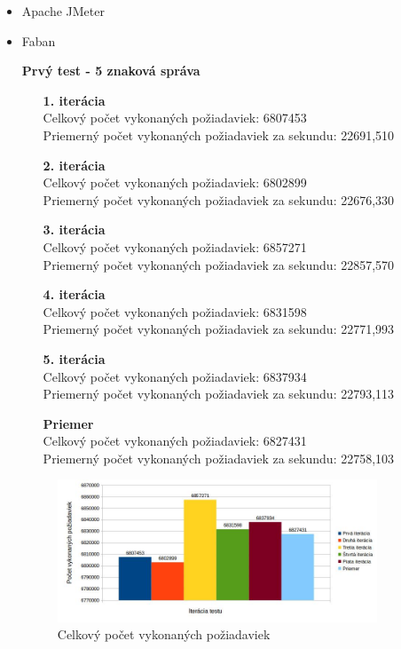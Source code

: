 \documentclass[12pt,oneside,final]{fithesis-utf8}
\begin{document}
\begin{itemize}

\item Apache JMeter

\item Faban

\textbf{Prvý test - 5 znaková správa}
\begin{itemize}

\item[\textbf{1. iterácia}]\ \\
Celkový počet vykonaných požiadaviek: 6807453\\
Priemerný počet vykonaných požiadaviek za sekundu: 22691,510

\item[\textbf{2. iterácia}]\ \\
Celkový počet vykonaných požiadaviek: 6802899\\
Priemerný počet vykonaných požiadaviek za sekundu: 22676,330

\item[\textbf{3. iterácia}]\ \\
Celkový počet vykonaných požiadaviek: 6857271\\
Priemerný počet vykonaných požiadaviek za sekundu: 22857,570

\item[\textbf{4. iterácia}]\ \\
Celkový počet vykonaných požiadaviek: 6831598\\
Priemerný počet vykonaných požiadaviek za sekundu: 22771,993

\item[\textbf{5. iterácia}]\ \\
Celkový počet vykonaných požiadaviek: 6837934\\
Priemerný počet vykonaných požiadaviek za sekundu: 22793,113

\item[\textbf{Priemer}]\ \\
Celkový počet vykonaných požiadaviek: 6827431\\
Priemerný počet vykonaných požiadaviek za sekundu: 22758,103

\end{itemize}

\begin{figure}[H]
  \centering
      \includegraphics[width=0.9\textwidth]{faban3_1.jpg}
  \caption{Celkový počet vykonaných požiadaviek}
\end{figure}


\end{itemize}
\end{document}
